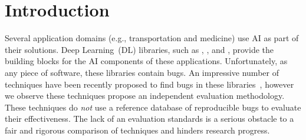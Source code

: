 \documentclass[sigconf,screen]{acmart}
\begin{document}



\maketitle


\section{Introduction}

\sloppy Several application domains (e.g., transportation and
medicine) use AI as part of their solutions. Deep Learning~(DL)
libraries, such as \jax, \torch{}, and \tf{}, provide the building
blocks for the AI components of these applications.  Unfortunately, as
any piece of software, these libraries contain bugs. An impressive
number of techniques have been recently proposed to find bugs in these
libraries~\cite{wei2022free,xie2022docter,deng2022fuzzing,pham2019cradle,guo2020audee,wang2020deep,gu2022muffin,deng2023large,liu2023nnsmith,liu2023neuri,shi2023acetest,deng2023largeedge},
however we observe these techniques propose an independent evaluation
methodology. These techniques do \emph{not} use a reference database
of reproducible bugs to evaluate their effectiveness. The lack of an
evaluation standards is a serious obstacle to a fair and rigorous
comparison of techniques and hinders research progress.
\end{document}
